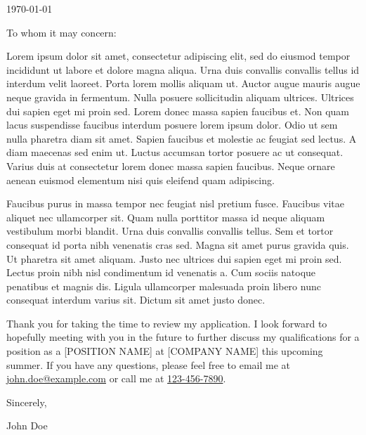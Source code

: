 \documentclass{ExpressiveCoverLetter}
\begin{document}
\coverletterheader[
    firstname=John,
    middleinitial=N,
    lastname=Doe,
    email=john.doe@example.com,
    phone=123-456-7890,
    github=johndoe,
    city=Town,
    state=State
]

\vspace{0.25in}
\today
\vspace{0.15in}


To whom it may concern:

Lorem ipsum dolor sit amet, consectetur adipiscing elit, sed do eiusmod
tempor incididunt ut labore et dolore magna aliqua. Urna duis convallis
convallis tellus id interdum velit laoreet. Porta lorem mollis aliquam
ut. Auctor augue mauris augue neque gravida in fermentum. Nulla posuere
sollicitudin aliquam ultrices. Ultrices dui sapien eget mi proin sed.
Lorem donec massa sapien faucibus et. Non quam lacus suspendisse
faucibus interdum posuere lorem ipsum dolor. Odio ut sem nulla pharetra
diam sit amet. Sapien faucibus et molestie ac feugiat sed lectus. A
diam maecenas sed enim ut. Luctus accumsan tortor posuere ac ut
consequat. Varius duis at consectetur lorem donec massa sapien
faucibus. Neque ornare aenean euismod elementum nisi quis eleifend quam
adipiscing.

Faucibus purus in massa tempor nec feugiat nisl pretium fusce. Faucibus
vitae aliquet nec ullamcorper sit. Quam nulla porttitor massa id neque
aliquam vestibulum morbi blandit. Urna duis convallis convallis tellus.
Sem et tortor consequat id porta nibh venenatis cras sed. Magna sit
amet purus gravida quis. Ut pharetra sit amet aliquam. Justo nec
ultrices dui sapien eget mi proin sed. Lectus proin nibh nisl
condimentum id venenatis a. Cum sociis natoque penatibus et magnis dis.
Ligula ullamcorper malesuada proin libero nunc consequat interdum
varius sit. Dictum sit amet justo donec.

Thank you for taking the time to review my application. I look forward
to hopefully meeting with you in the future to further discuss my
qualifications for a position as a [POSITION NAME] at [COMPANY NAME]
this upcoming summer. If you have any questions, please feel free to
email me at \href{mailto:john.doe@example.com}{john.doe@example.com} or
call me at \href{tel:+1-123-456-7890}{123-456-7890}.

Sincerely,

\vspace{.15in}

John Doe
\end{document}
